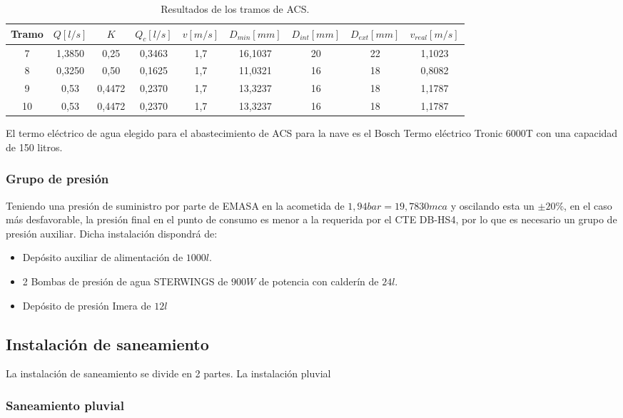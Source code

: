 \documentclass[../main.tex]{subfiles}
\begin{document}
\begin{table}[H]
    \centering
    \begin{tabular}{c | c | c | c | c | c | c | c | c}
         Tramo & $Q [l/s]$ & $K$ & $Q_c [l/s]$ & $v [m/s]$ & $D_{min} [mm]$ & $D_{int} [mm]$ & $D_{ext} [mm]$ & $v_{real} [m/s]$ \\ \hline
         7 & 1,3850 & 0,25 & 0,3463 & 1,7 & 16,1037 & 20 & 22 & 1,1023\\
         8 & 0,3250 & 0,50 & 0,1625 & 1,7 & 11,0321 & 16 & 18 & 0,8082\\
         9 & 0,53 & 0,4472 & 0,2370 & 1,7 & 13,3237 & 16 & 18 & 1,1787\\
         10 & 0,53 & 0,4472 & 0,2370 & 1,7 & 13,3237 & 16 & 18 & 1,1787\\
    \end{tabular}
    \caption{Resultados de los tramos de ACS.}
\end{table}

El termo eléctrico de agua elegido para el abastecimiento de ACS para la nave es el Bosch Termo eléctrico Tronic 6000T con una capacidad de 150 litros.

\subsubsection{Grupo de presión}
Teniendo una presión de suministro por parte de EMASA en la acometida de $1,94 bar = 19,7830 mca$ y oscilando esta un $\pm 20 \%$, en el caso más desfavorable, la presión final en el punto de consumo es menor a la requerida por el CTE DB-HS4, por lo que es necesario un grupo de presión auxiliar. Dicha instalación dispondrá de:
\begin{itemize}
    \item Depósito auxiliar de alimentación de $1000 l$.
    \item 2 Bombas de presión de agua STERWINGS de $900 W$ de potencia con calderín de $24 l$.
    \item Depósito de presión Imera de $12 l$
\end{itemize}

\subsection{Instalación de saneamiento}

La instalación de saneamiento se divide en 2 partes. La instalación pluvial

\subsubsection{Saneamiento pluvial}
\end{document}
